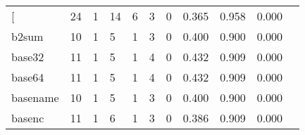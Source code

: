 \begin{longtable}{lp{1.20cm}p{1.20cm}p{1.20cm}p{1.20cm}p{1.20cm}p{1.20cm}p{1.20cm}p{1.20cm}p{1.20cm}p{1.20cm}}
\bottomrule
\endlastfoot
{[}         &                                    24 &                                                  1 &                                                 14 &                                                  6 &                                                  3 &                                                  0 &                                         0.365 &                                              0.958 &                                              0.000 \\
b2sum     &                                    10 &                                                  1 &                                                  5 &                                                  1 &                                                  3 &                                                  0 &                                         0.400 &                                              0.900 &                                              0.000 \\
base32    &                                    11 &                                                  1 &                                                  5 &                                                  1 &                                                  4 &                                                  0 &                                         0.432 &                                              0.909 &                                              0.000 \\
base64    &                                    11 &                                                  1 &                                                  5 &                                                  1 &                                                  4 &                                                  0 &                                         0.432 &                                              0.909 &                                              0.000 \\
basename  &                                    10 &                                                  1 &                                                  5 &                                                  1 &                                                  3 &                                                  0 &                                         0.400 &                                              0.900 &                                              0.000 \\
basenc    &                                    11 &                                                  1 &                                                  6 &                                                  1 &                                                  3 &                                                  0 &                                         0.386 &                                              0.909 &                                              0.000 \\

\end{longtable}
